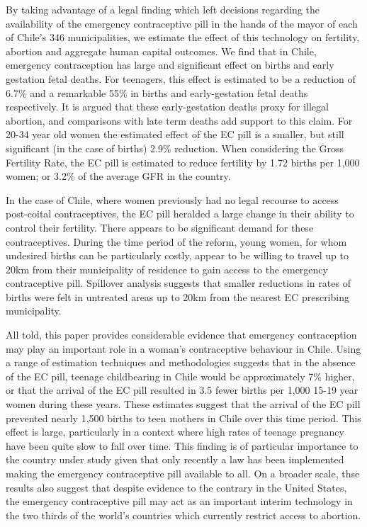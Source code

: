 By taking advantage of a legal finding which left decisions regarding the 
availability of the emergency contraceptive pill in the hands of the mayor of
each of Chile's 346 municipalities, we estimate the effect of this technology on 
fertility, abortion and aggregate human capital outcomes. We find that in Chile,
emergency contraception has large and significant effect on births and early 
gestation fetal deaths.  For teenagers, this effect is estimated to be a
reduction of 6.7\% and a remarkable 55\% in births and early-gestation fetal 
deaths respectively.  It is argued that these early-gestation deaths proxy for
illegal abortion, and comparisons with late term deaths add support to this
claim. For 20-34 year old women the estimated effect of the EC pill is a
smaller, but still significant (in the case of births) 2.9\% reduction.  When
considering the Gross Fertility Rate, the EC pill is estimated to reduce
fertility by 1.72 births per 1,000 women; or 3.2\% of the average GFR in the
country.

In the case of Chile, where women previously had no legal recourse to access
post-coital contraceptives, the EC pill heralded a large change in their ability
to control their fertility.  There appears to be significant demand for these
contraceptives.  During the time period of the reform, young women, for whom
undesired births can be particularly costly, appear to be willing to travel up
to 20km from their municipality of residence to gain access to the emergency
contraceptive pill.  Spillover analysis suggests that smaller reductions in 
rates of births were felt in untreated areas up to 20km from the nearest EC
prescribing municipality.

All told, this paper provides considerable evidence that emergency contraception 
may play an important role in a woman's contraceptive behaviour in Chile.  Using
a range of estimation techniques and methodologies suggests that in the absence
of the EC pill, teenage childbearing in Chile would be approximately 7\% higher,
or that the arrival of the EC pill resulted in 3.5 fewer births per 1,000 15-19
year women during these years.  These estimates suggest that the arrival of the
EC pill prevented nearly 1,500 births to teen mothers in Chile over this time 
period. This effect is large, particularly in a context where high rates of 
teenage pregnancy have been quite slow to fall over time. This finding is of 
particular importance to the country under study given that only recently a law
has been implemented making the emergency contraceptive pill available to all. On
a broader scale, thse results also suggest that despite evidence to the contrary
in the United States, the emergency contraceptive pill may act as an important
interim technology in the two thirds of the world's countries which currently
restrict access to abortion.

